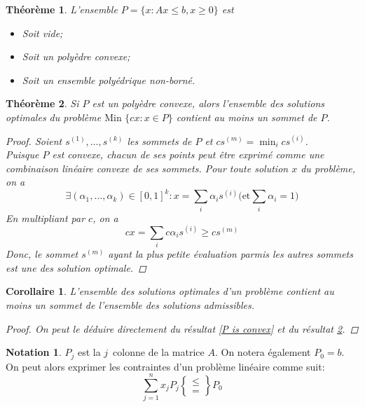 \documentclass[a4paper]{report}
\theoremstyle{definition}
\newtheorem*{notation}{Notation}
\theoremstyle{remark}
\theoremstyle{plain}
\newtheorem{theorem}{Théorème}
\newtheorem{corollary}{Corollaire}
\begin{document}
\begin{theorem}
L'ensemble \(P = \{x:Ax\le b,x\ge 0\}\) est
\begin{itemize}
	\item Soit vide;
	\item Soit un polyèdre convexe;
	\item Soit un ensemble polyédrique non-borné.
\end{itemize}
\end{theorem}

\begin{theorem}
\label{solutions contains a vertex}
Si \(P\) est un polyèdre convexe, alors l'ensemble des solutions optimales
du problème \(\text{Min }\{cx:x\in P\}\) contient au moins un sommet de \(P\).
\begin{proof}
Soient \(s^{(1)},\dots,s^{(k)}\) les sommets de \(P\) et
\(cs^{(m)}=\min_ics^{(i)}\).\\ Puisque \(P\) est convexe, chacun de ses points
peut être exprimé comme une combinaison linéaire convexe de ses sommets. Pour
toute solution \(x\) du problème, on a
\[\exists (\alpha_1,\dots,\alpha_k)\in[0,1]^k:x=\sum_i \alpha_is^{(i)}\text{
(et}\sum_i\alpha_i=1\text{)}\] En multipliant par \(c\), on a
\[cx=\sum_ic\alpha_is^{(i)}\ge cs^{(m)}\]
Donc, le sommet \(s^{(m)}\) ayant la plus petite évaluation parmis les autres
sommets est une des solution optimale.
\end{proof}
\end{theorem}

\begin{corollary}
L'ensemble des solutions optimales d'un problème contient au moins un sommet de
l'ensemble des solutions admissibles.
\begin{proof}
On peut le déduire directement du résultat \ref{P is convex} et du résultat
\ref{solutions contains a vertex}.
\end{proof}
\end{corollary}

\begin{notation}
\(P_j\) est la \(j\)\ieme \(\,\) colonne de la matrice \(A\).
On notera également \(P_0=b\).
On peut alors exprimer les contraintes d'un problème linéaire comme suit:
\[\sum_{j=1}^n x_jP_j \begin{Bmatrix}\le\\=\end{Bmatrix} P_0\]
\end{notation}
\end{document}
